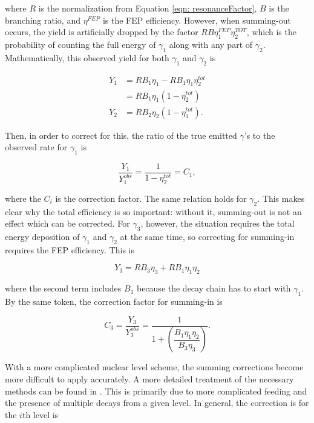 \noindent where $R$ is the normalization from Equation \ref{eqn: resonanceFactor}, $B$ is the branching ratio, and $\eta^{FEP}$ is the FEP efficiency. However, when summing-out occurs, the yield is artificially dropped by the factor $R B \eta^{FEP}_{1} \eta^{TOT}_{2}$, which is the probability of counting the full energy of $\gamma_{1}$ along with any part of $\gamma_{2}$. Mathematically, this observed yield for both $\gamma_{1}$ and $\gamma_{2}$ is

\begin{align}
Y_{1} &= R B_{1} \eta_{1} - R B_{1} \eta_{1} \eta^{tot}_{2} \\
        &= R B_{1} \eta_{1} \left( 1 - \eta^{tot}_{2} \right) \\
Y_{2} &= R B_{2} \eta_{2} \left( 1 - \eta^{tot}_{1} \right).
\end{align}

\noindent Then, in order to correct for this, the ratio of the true emitted $\gamma$'s to the observed rate for $\gamma_{1}$ is

\begin{equation}
\dfrac{Y_{1}}{Y^{obs}_{1}} = \dfrac{1}{1 - \eta^{tot}_{2}} = C_{1},
\end{equation}

\noindent where the $C_{i}$ is the correction factor. The same relation holds for $\gamma_{2}$. This makes clear why the total efficiency is so important: without it, summing-out is not an effect which can be corrected. For $\gamma_{3}$, however, the situation requires the total energy deposition of $\gamma_{1}$ and $\gamma_{2}$ at the same time, so correcting for summing-in requires the FEP efficiency. This is

\begin{equation}
Y_{3} = R B_{3} \eta_{3} + R B_{1} \eta_{1} \eta_{2}
\end{equation} 

\noindent where the second term includes $B_{1}$ because the decay chain has to start with $\gamma_{1}$. By the same token, the correction factor for summing-in is

\begin{equation}
C_{3} = \dfrac{Y_{3}}{Y_{3}^{obs}} = \dfrac{1}{1 + \left( \dfrac{B_{1} \eta_{1} \eta_{2}} {B_{3} \eta_{3}}  \right)}.
\end{equation}


With a more complicated nuclear level scheme, the summing corrections become more difficult to apply accurately. A more detailed treatment of the necessary methods can be found in \cite{DebertinHelmerBook}. This is primarily due to more complicated feeding and the presence of multiple decays from a given level. In general, the correction is for the $i$th level is

